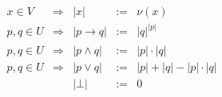 \documentclass{standalone}
\begin{document}
$
\begin{array}{rcrcl}
x\in{}V   & \Longrightarrow & \left|x\right|               & := & \nu\left(x\right)                                               \\
p,q\in{}U & \Longrightarrow & \left|p\rightarrow{}q\right| & := & \left|q\right|_{}^{\left|p\right|}                              \\
p,q\in{}U & \Longrightarrow & \left|p\land{}q\right|       & := & \left|p\right|\cdot\left|q\right|                               \\
p,q\in{}U & \Longrightarrow & \left|p\lor{}q\right|        & := & \left|p\right|+\left|q\right|-\left|p\right|\cdot\left|q\right| \\
          &                 & \left|\bot\right|            & := & 0                                                               \\
\end{array}
$
\end{document}
